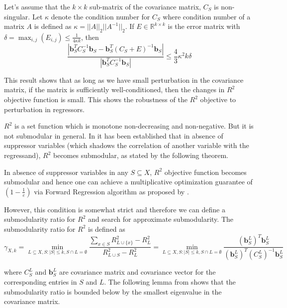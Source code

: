 \begin{lemma}
 Let's assume that the $k\times k$ sub-matrix of the covariance matrix, $C_S$ is non-singular. Let $\kappa$ denote the condition number for $C_S$ where condition number of a matrix $A$ is defined as $\kappa=||A||_2||A^{-1}||_2$. If $E\in \mathbb{R}^{k\times k}$ is the error matrix with $\delta=\max_{i,j}(E_{i,j})\le \frac{1}{4\kappa k}$, then
 \[
 \frac{|\mathbf{b}_S^T C_S^{-1} \mathbf{b}_S - \mathbf{b}_S^T (C_S+E)^{-1} \mathbf{b}_S|}{|\mathbf{b}_S^T C_S^{-1} \mathbf{b}_S|}\le \frac{4}{3}\kappa^2 k \delta
 \]
\end{lemma}

\noindent This result shows that as long as we have small perturbation in the covariance matrix, if the matrix is sufficiently well-conditioned, then the changes in $R^2$ objective function is small. This shows the robustness of the $R^2$ objective to perturbation in regressors.

$R^2$ is a set function which is monotone non-decreasing and non-negative. But it is not submodular in general. In \citealp{Das:2008:ASS:1374376.1374384} it has been established that in absence of suppressor variables (which shadows the correlation of another variable with the regressand), $R^2$ becomes submodular, as stated by the following theorem.

\begin{theorem}
 In absence of suppressor variables in any $S\subseteq X$, $R^2$ objective function becomes submodular and hence one can achieve a multiplicative optimization guarantee of $(1-\frac{1}{e})$ via Forward Regression algorithm as proposed by \citealp{nemhauser1978analysis}.
\end{theorem}

\noindent However, this condition is somewhat strict and therefore we can define a submodularity ratio for $R^2$ and search for approximate submodularity. The submodularity ratio for $R^2$ is defined as
\[
 \gamma_{X,k}=\min_{L\subseteq X, S:|S|\le k, S\cap L=\emptyset}\frac{\sum_{x\in S}R^2_{L\cup\{x\}}-R^2_L}{R^2_{L\cup S}-R^2_L}=\min_{L\subseteq X, S:|S|\le k, S\cap L=\emptyset}\frac{(\mathbf{b}_S^L)^T\mathbf{b}_S^L}{(\mathbf{b}_S^L)^T(C_S^L)^{-1}\mathbf{b}_S^L}
\]

\noindent where $C_S^L$ and $\mathbf{b}_S^L$ are covariance matrix and covariance vector for the corresponding entries in $S$ and $L$. The following lemma from \citealp{DasDK11} shows that the submodularity ratio is bounded below by the smallest eigenvalue in the covariance matrix.


